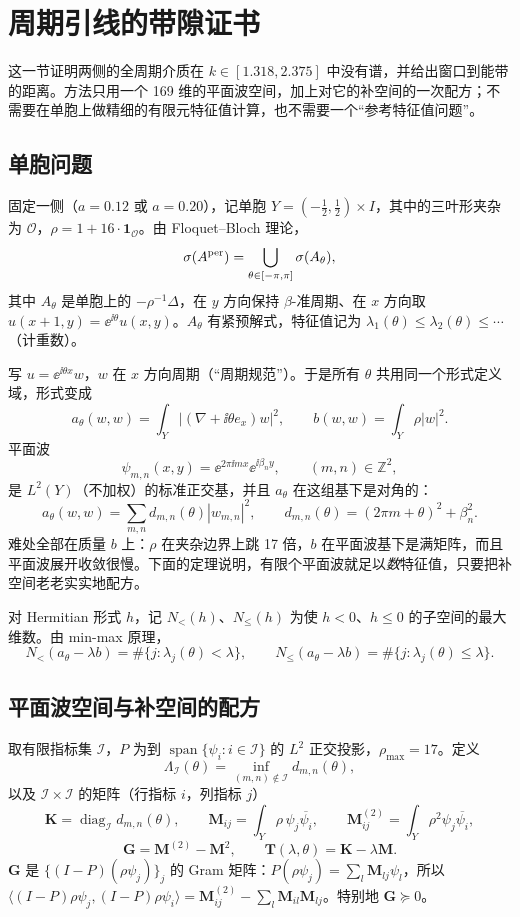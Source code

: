 \documentclass[11pt,a4paper,fontset=fandol]{ctexart}
\begin{document}
\section{周期引线的带隙证书}
\label{sec:band}
这一节证明两侧的全周期介质在 $k\in[1.318,2.375]$ 中没有谱，并给出窗口到能带的距离。方法只用一个 169 维的平面波空间，加上对它的补空间的一次配方；不需要在单胞上做精细的有限元特征值计算，也不需要一个“参考特征值问题”。

\subsection{单胞问题}

固定一侧（$a=0.12$ 或 $a=0.20$），记单胞 $Y=(-\tfrac12,\tfrac12)\times I$，其中的三叶形夹杂为 $\mathcal O$，$\rho=1+16\cdot\mathbf 1_{\mathcal O}$。由 Floquet--Bloch 理论，
\[
\sigma(A^{\rm per})=\bigcup_{\theta\in[-\pi,\pi]}\sigma(A_\theta),
\]
其中 $A_\theta$ 是单胞上的 $-\rho^{-1}\Delta$，在 $y$ 方向保持 $\beta$-准周期、在 $x$ 方向取 $u(x+1,y)=\ee^{\ii\theta}u(x,y)$。$A_\theta$ 有紧预解式，特征值记为 $\lambda_1(\theta)\le\lambda_2(\theta)\le\cdots$（计重数）。

写 $u=\ee^{\ii\theta x}w$，$w$ 在 $x$ 方向周期（“周期规范”）。于是所有 $\theta$ 共用同一个形式定义域，形式变成
\[
a_\theta(w,w)=\int_Y|(\nabla+\ii\theta e_x)w|^2,\qquad b(w,w)=\int_Y\rho|w|^2 .
\]
平面波
\[
\psi_{m,n}(x,y)=\ee^{2\pi\ii mx}\ee^{\ii\beta_ny},\qquad (m,n)\in\mathbb Z^2,
\]
是 $L^2(Y)$（不加权）的标准正交基，并且 $a_\theta$ 在这组基下是对角的：
\[
a_\theta(w,w)=\sum_{m,n}d_{m,n}(\theta)|w_{m,n}|^2,\qquad d_{m,n}(\theta)=(2\pi m+\theta)^2+\beta_n^2 .
\]
难处全部在质量 $b$ 上：$\rho$ 在夹杂边界上跳 17 倍，$b$ 在平面波基下是满矩阵，而且平面波展开收敛很慢。下面的定理说明，有限个平面波就足以\emph{数}特征值，只要把补空间老老实实地配方。

对 Hermitian 形式 $h$，记 $N_<(h)$、$N_\le(h)$ 为使 $h<0$、$h\le0$ 的子空间的最大维数。由 min-max 原理，
\[
N_<(a_\theta-\lambda b)=\#\{j:\lambda_j(\theta)<\lambda\},\qquad N_\le(a_\theta-\lambda b)=\#\{j:\lambda_j(\theta)\le\lambda\}.
\]

\subsection{平面波空间与补空间的配方}

取有限指标集 $\mathcal I$，$P$ 为到 $\operatorname{span}\{\psi_i:i\in\mathcal I\}$ 的 $L^2$ 正交投影，$\rho_{\max}=17$。定义
\[
\Lambda_{\mathcal I}(\theta)=\inf_{(m,n)\notin\mathcal I}d_{m,n}(\theta),
\]
以及 $\mathcal I\times\mathcal I$ 的矩阵（行指标 $i$，列指标 $j$）
\[
\bm K=\operatorname{diag}_{\mathcal I}d_{m,n}(\theta),\qquad
\bm M_{ij}=\int_Y\rho\,\psi_j\overline{\psi_i},\qquad
\bm M^{(2)}_{ij}=\int_Y\rho^2\psi_j\overline{\psi_i},
\]
\[
\bm G=\bm M^{(2)}-\bm M^2,\qquad \bm T(\lambda,\theta)=\bm K-\lambda\bm M .
\]
$\bm G$ 是 $\{(I-P)(\rho\psi_j)\}_j$ 的 Gram 矩阵：$P(\rho\psi_j)=\sum_l\bm M_{lj}\psi_l$，所以
$\langle(I-P)\rho\psi_j,(I-P)\rho\psi_i\rangle=\bm M^{(2)}_{ij}-\sum_l\bm M_{il}\bm M_{lj}$。特别地 $\bm G\succeq0$。
\end{document}

